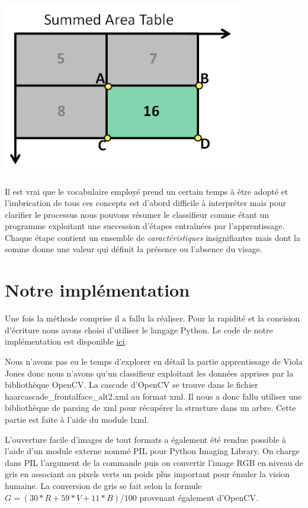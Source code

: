 \documentclass[a4paper,11pt]{report}
\begin{document}
	\includegraphics[width=300pt]{integral-image.png}

\par
	Il est vrai que le vocabulaire employé prend un certain temps à être adopté et l’imbrication de tous ces concepts est d'abord difficile à interpréter mais pour clarifier le processus nous pouvons résumer le classifieur comme étant un programme exploitant une succession d’étapes entraînées par l’apprentissage. Chaque étape contient un ensemble de \textit{caractéristiques} insignifiantes mais dont la somme donne une valeur qui définit la présence ou l’absence du visage.

\chapter{Notre implémentation}
	Une fois la méthode comprise il a fallu la réaliser. Pour la rapidité et la concision d’écriture nous avons choisi d’utiliser le langage Python. Le code de notre implémentation est disponible \href{https://github.com/FlorentRevest/ViolaJones}{ici}.

	Nous n’avons pas eu le temps d’explorer en détail la partie apprentissage de Viola Jones donc nous n’avons qu’un classifieur exploitant les données apprises par la bibliothèque OpenCV. La cascade d’OpenCV se trouve dans le fichier haarcascade\_frontalface\_alt2.xml au format xml. Il nous a donc fallu utiliser une bibliothèque de parsing de xml pour récupérer la structure dans un arbre. Cette partie est faite à l’aide du module lxml.

	L’ouverture facile d’images de tout formats a également été rendue possible à l’aide d’un module externe nommé PIL pour Python Imaging Library. On charge dans PIL l’argument de la commande puis on convertir l’image RGB en niveau de gris en associant au pixels verts un poids plus important pour émuler la vision humaine. La conversion de gris se fait selon la formule $G = (30*R+59*V+11*B)/100$ provenant également d'OpenCV.
\end{document}
